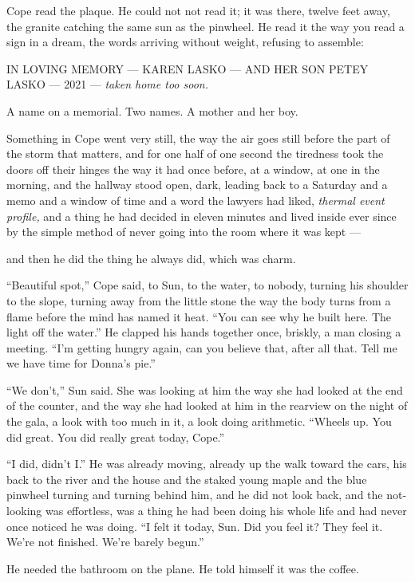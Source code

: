 \documentclass[11pt,openany]{book}
\begin{document}
Cope read the plaque. He could not not read it; it was there, twelve feet away, the granite catching the same sun as the pinwheel. He read it the way you read a sign in a dream, the words arriving without weight, refusing to assemble:

IN LOVING MEMORY --- KAREN LASKO --- AND HER SON PETEY LASKO --- 2021 --- \textit{taken home too soon.}

A name on a memorial. Two names. A mother and her boy.

Something in Cope went very still, the way the air goes still before the part of the storm that matters, and for one half of one second the tiredness took the doors off their hinges the way it had once before, at a window, at one in the morning, and the hallway stood open, dark, leading back to a Saturday and a memo and a window of time and a word the lawyers had liked, \textit{thermal event profile,} and a thing he had decided in eleven minutes and lived inside ever since by the simple method of never going into the room where it was kept ---

and then he did the thing he always did, which was charm.

``Beautiful spot,'' Cope said, to Sun, to the water, to nobody, turning his shoulder to the slope, turning away from the little stone the way the body turns from a flame before the mind has named it heat. ``You can see why he built here. The light off the water.'' He clapped his hands together once, briskly, a man closing a meeting. ``I'm getting hungry again, can you believe that, after all that. Tell me we have time for Donna's pie.''

``We don't,'' Sun said. She was looking at him the way she had looked at the end of the counter, and the way she had looked at him in the rearview on the night of the gala, a look with too much in it, a look doing arithmetic. ``Wheels up. You did great. You did really great today, Cope.''

``I did, didn't I.'' He was already moving, already up the walk toward the cars, his back to the river and the house and the staked young maple and the blue pinwheel turning and turning behind him, and he did not look back, and the not-looking was effortless, was a thing he had been doing his whole life and had never once noticed he was doing. ``I felt it today, Sun. Did you feel it? They feel it. We're not finished. We're barely begun.''

He needed the bathroom on the plane. He told himself it was the coffee.
\end{document}
